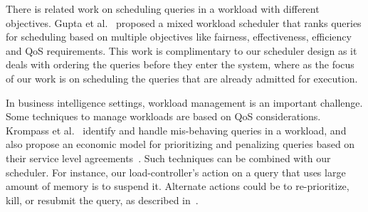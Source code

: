 
There is related work on scheduling queries in a workload with different objectives. 
Gupta et al.~\cite{gupta2009fair} proposed a mixed workload scheduler %
that ranks queries for scheduling based on multiple objectives like fairness, effectiveness, efficiency and QoS requirements. 
This work is complimentary to our scheduler design as it deals with ordering the queries before they enter the system, where as the focus of our work is on scheduling the queries that are already admitted for execution. 

In business intelligence settings, workload management is an important challenge.
Some techniques to manage workloads are based on QoS considerations. 
Krompass et al.~\cite{krompass2007dynamic} identify and handle mis-behaving queries in a workload, and also propose an economic model for prioritizing and penalizing queries based on their service level agreements~\cite{krompass2006quality}.
Such techniques can be combined with our scheduler. 
For instance, our load-controller's action on a query that uses large amount of memory is to suspend it. 
Alternate actions could be to re-prioritize, kill, or resubmit the query, as described in~\cite{krompass2007dynamic}.

